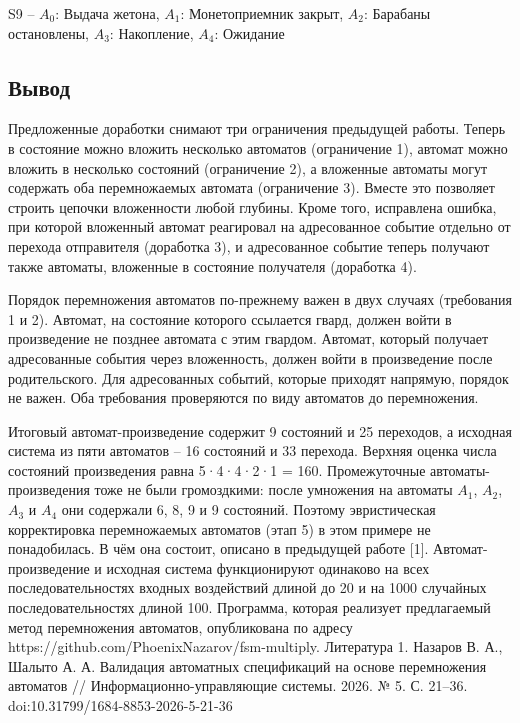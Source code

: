 \documentclass[12pt]{article}
\begin{document}
S9 – $A_{0}$: Выдача жетона, $A_{1}$: Монетоприемник закрыт, $A_{2}$: Барабаны остановлены, $A_{3}$: Накопление, $A_{4}$: Ожидание


\subsection*{Вывод}

Предложенные доработки снимают три ограничения предыдущей работы. Теперь в состояние можно вложить несколько автоматов (ограничение 1), автомат можно вложить в несколько состояний (ограничение 2), а вложенные автоматы могут содержать оба перемножаемых автомата (ограничение 3). Вместе это позволяет строить цепочки вложенности любой глубины. Кроме того, исправлена ошибка, при которой вложенный автомат реагировал на адресованное событие отдельно от перехода отправителя (доработка 3), и адресованное событие теперь получают также автоматы, вложенные в состояние получателя (доработка 4).

Порядок перемножения автоматов по-прежнему важен в двух случаях (требования 1 и 2). Автомат, на состояние которого ссылается гвард, должен войти в произведение не позднее автомата с этим гвардом. Автомат, который получает адресованные события через вложенность, должен войти в произведение после родительского. Для адресованных событий, которые приходят напрямую, порядок не важен. Оба требования проверяются по виду автоматов до перемножения.

Итоговый автомат-произведение содержит 9 состояний и 25 переходов, а исходная система из пяти автоматов – 16 состояний и 33 перехода. Верхняя оценка числа состояний произведения равна 5·4·4·2·1 = 160. Промежуточные автоматы-произведения тоже не были громоздкими: после умножения на автоматы $A_{1}$, $A_{2}$, $A_{3}$ и $A_{4}$ они содержали 6, 8, 9 и 9 состояний. Поэтому эвристическая корректировка перемножаемых автоматов (этап 5) в этом примере не понадобилась. В чём она состоит, описано в предыдущей работе [1]. Автомат-произведение и исходная система функционируют одинаково на всех последовательностях входных воздействий длиной до 20 и на 1000 случайных последовательностях длиной 100. Программа, которая реализует предлагаемый метод перемножения автоматов, опубликована по адресу https://github.com/PhoenixNazarov/fsm-multiply.
Литература
1. Назаров В. А., Шалыто А. А. Валидация автоматных спецификаций на основе перемножения автоматов // Информационно-управляющие системы. 2026. № 5. С. 21–36. doi:10.31799/1684-8853-2026-5-21-36
\end{document}
